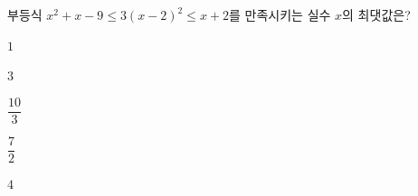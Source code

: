부등식 $x^2+x-9\le 3(x-2)^2\le x+2$를 만족시키는 실수 $x$의 최댓값은?
\begin{choices32}{\rule[-3ex]{0pt}{8ex}$1$}{\rule[-3ex]{0pt}{8ex}$3$}{\rule[-3ex]{0pt}{8ex}$\dfrac{10}{3}$}{\rule[-3ex]{0pt}{8ex}$\dfrac{7}{2}$}{\rule[-3ex]{0pt}{8ex}$4$}\end{choices32}
